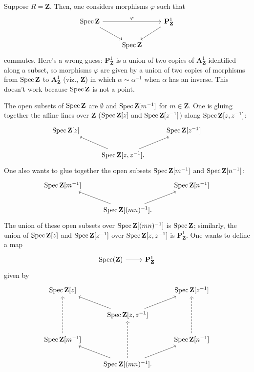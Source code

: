 \documentclass [11 pt, oneside] {article}
\begin{document}
\begin{example}[ ]\label{}\text{}
Suppose $R=\mathbf{Z}$. Then, one considers morphisms $\varphi$ such that
\[
\begin{tikzcd}
	\Spec \mathbf{Z} \ar[rd]\ar[rr,"\varphi"] &&\mathbf{P}^1_{\mathbf{Z}}\ar[ld]\\
						  &\Spec \mathbf{Z}
\end{tikzcd}
\]
commutes.
Here's a wrong guess: $\mathbf{P}^1_{\mathbf{Z}}$ is a union of two copies of $\mathbf{A}^1_{\mathbf{Z}}$ identified along a subset, so morphisms $\varphi$ are given by a union of two copies of morphisms from $\operatorname{Spec} \mathbf{Z}$ to $\mathbf{A}^1_{\mathbf{Z}}$ (viz., $\mathbf{Z}$) in which $\alpha\sim \alpha^{-1}$ when $\alpha$ has an inverse. This doesn't work because $\operatorname{Spec} \mathbf{Z}$ is not a point.

The open subsets of $\operatorname{Spec} \mathbf{Z}$ are $\emptyset$ and $\operatorname{Spec} \mathbf{Z}[m^{-1}]$ for $m\in \mathbf{Z}$. One is gluing together the affine lines over $\mathbf{Z}$ ($\operatorname{Spec} \mathbf{Z}[z]$ and $\operatorname{Spec} \mathbf{Z}[z^{-1}]$) along $\operatorname{Spec} \mathbf{Z}[z,z^{-1}]$:
\[
\begin{tikzcd}
	\Spec \mathbf{Z}[z] &&\Spec \mathbf{Z}[z^{-1}]\\
			    &\Spec \mathbf{Z}[z,z^{-1}]. \ar[ru]\ar[lu]
\end{tikzcd}
\]
One also wants to glue together the open subsets $\operatorname{Spec} \mathbf{Z}[m^{-1}]$ and $\operatorname{Spec} \mathbf{Z}[n^{-1}]$:
\[
\begin{tikzcd}
	\Spec \mathbf{Z}[m^{-1}] &&\Spec \mathbf{Z}[n^{-1}]\\
	&\Spec \mathbf{Z}[(mn)^{-1}]. \ar[ru]\ar[lu]
\end{tikzcd}
\]
The union of these open subsets over $\operatorname{Spec} \mathbf{Z}[(mn)^{-1}]$ is $\operatorname{Spec} \mathbf{Z}$; similarly, the union of $\operatorname{Spec} \mathbf{Z}[z]$ and $\operatorname{Spec} \mathbf{Z}[z^{-1}]$ over $\operatorname{Spec} \mathbf{Z}[z,z^{-1}]$ is $\mathbf{P}^1_{\mathbf{Z}}$. One wants to define a map 
\[
\begin{tikzcd}
\Spec (\mathbf{Z})\ar[r]& \mathbf{P}^1_{\mathbf{Z}}
\end{tikzcd}
\] 
given by
\[
\begin{tikzcd}
	\Spec \mathbf{Z}[z] &&\Spec \mathbf{Z}[z^{-1}]\\
	&\Spec \mathbf{Z}[z,z^{-1}] \ar[ru]\ar[lu]\\
	\Spec \mathbf{Z}[m^{-1}]\ar[uu, dashed]  &&\Spec \mathbf{Z}[n^{-1}]\ar[uu, dashed]\\
	&\Spec \mathbf{Z}[(mn)^{-1}].\ar[uu, dashed] \ar[ru]\ar[lu]
\end{tikzcd}
\]
\end{example}
\end{document}
